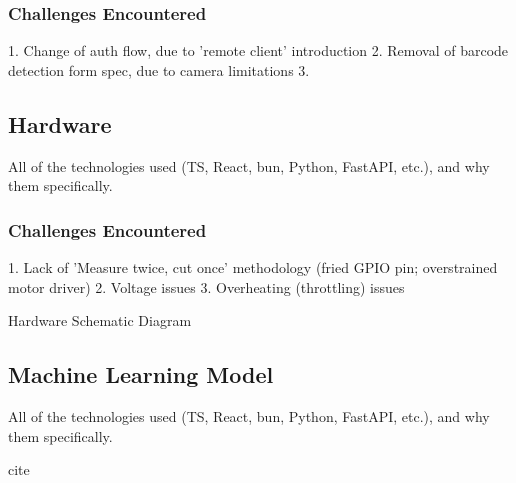             \subsubsection{Challenges Encountered}
                \begin{temp}
                    1. Change of auth flow, due to 'remote client' introduction
                    2. Removal of barcode detection form spec, due to camera limitations
                    3. \cite{spotify2025security}
                \end{temp}
    
        \subsection{Hardware}
    
            \begin{temp}
                All of the technologies used (TS, React, bun, Python, FastAPI, etc.), and why them specifically.
            \end{temp}
        
            \subsubsection{Challenges Encountered}
                \begin{temp}
                    1. Lack of 'Measure twice, cut once' methodology (fried GPIO pin; overstrained motor driver)
                    2. Voltage issues
                    3. Overheating (throttling) issues
                \end{temp}
    
                \begin{temp}
                    Hardware Schematic Diagram
                \end{temp}
    
      \subsection{Machine Learning Model}
    
            \begin{temp}
                All of the technologies used (TS, React, bun, Python, FastAPI, etc.), and why them specifically.
            \end{temp}
    
            \begin{temp}
                cite \cite{Mitchell_2019}
            \end{temp}
    
